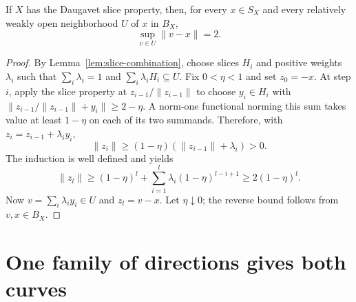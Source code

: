 \begin{lemma}\label{lem:diametral}
If $X$ has the Daugavet slice property, then, for every $x\in S_X$ and
every relatively weakly open neighborhood $U$ of $x$ in $B_X$,
\[
 \sup_{v\in U}\|v-x\|=2.
\]
\end{lemma}
\begin{proof}
By Lemma~\ref{lem:slice-combination}, choose slices $H_i$ and positive
weights $\lambda_i$ such that $\sum_i\lambda_i=1$ and
$\sum_i\lambda_iH_i\subseteq U$.  Fix $0<\eta<1$ and set $z_0=-x$.
At step $i$, apply the slice property at $z_{i-1}/\|z_{i-1}\|$ to choose
$y_i\in H_i$ with
$\|z_{i-1}/\|z_{i-1}\|+y_i\|\ge2-\eta$.
A norm-one functional norming this sum takes value at least $1-\eta$
on each of its two summands.  Therefore, with
$z_i=z_{i-1}+\lambda_i y_i$,
\[
 \|z_i\|\ge(1-\eta)(\|z_{i-1}\|+\lambda_i)>0.
\]
The induction is well defined and yields
\[
 \|z_l\|\ge(1-\eta)^l+
    \sum_{i=1}^l\lambda_i(1-\eta)^{l-i+1}
 \ge2(1-\eta)^l.
\]
Now $v=\sum_i\lambda_i y_i\in U$ and $z_l=v-x$.  Let
$\eta\downarrow0$; the reverse bound follows from $v,x\in B_X$.
\end{proof}

\section{One family of directions gives both curves}\label{sec:curves}

